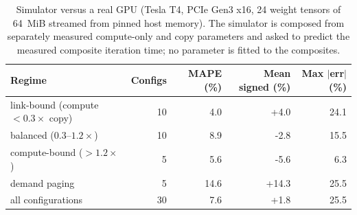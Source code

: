 \begin{table}[t]
\centering
\caption{Simulator versus a real GPU (Tesla T4, PCIe Gen3 x16, 24 weight tensors of 64~MiB streamed from pinned host memory). The simulator is composed from separately measured compute-only and copy parameters and asked to predict the measured composite iteration time; no parameter is fitted to the composites.}
\label{tab:hw}
\small
\begin{tabular}{lrrrr}
\toprule
\textbf{Regime} & \textbf{Configs} & \textbf{MAPE (\%)} & \textbf{Mean signed (\%)} & \textbf{Max $|$err$|$ (\%)}\\
\midrule
link-bound (compute $<0.3\times$ copy) & 10 & 4.0 & +4.0 & 24.1\\
balanced ($0.3$--$1.2\times$) & 10 & 8.9 & -2.8 & 15.5\\
compute-bound ($>1.2\times$) & 5 & 5.6 & -5.6 & 6.3\\
demand paging & 5 & 14.6 & +14.3 & 25.5\\
\midrule all configurations & 30 & 7.6 & +1.8 & 25.5\\
\bottomrule
\end{tabular}
\end{table}
